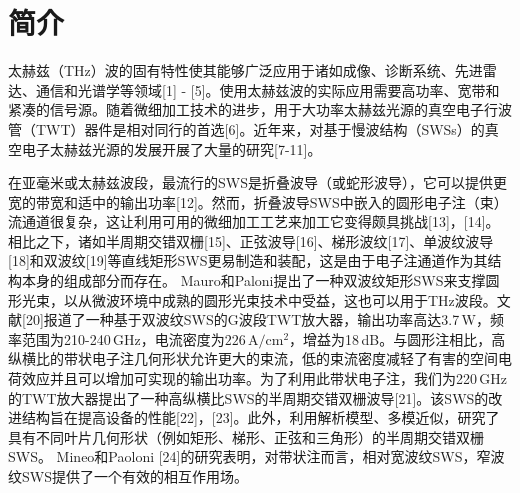 \documentclass[10pt,a4paper,UTF8]{ctexart}
\begin{document}
	\renewcommand\thesection{\Roman{section}}

\section{简介}
太赫兹（THz）波的固有特性使其能够广泛应用于诸如成像、诊断系统、先进雷达、通信和光谱学等领域[1] - [5]。使用太赫兹波的实际应用需要高功率、宽带和紧凑的信号源。随着微细加工技术的进步，用于大功率太赫兹光源的真空电子行波管（TWT）器件是相对同行的首选[6]。近年来，对基于慢波结构（SWSs）的真空电子太赫兹光源的发展开展了大量的研究[7-11]。

在亚毫米或太赫兹波段，最流行的SWS是折叠波导（或蛇形波导），它可以提供更宽的带宽和适中的输出功率[12]。然而，折叠波导SWS中嵌入的圆形电子注（束）流通道很复杂，这让利用可用的微细加工工艺来加工它变得颇具挑战[13]，[14]。相比之下，诸如半周期交错双栅[15]、正弦波导[16]、梯形波纹[17]、单波纹波导[18]和双波纹[19]等直线矩形SWS更易制造和装配，这是由于电子注通道作为其结构本身的组成部分而存在。 Mauro和Paloni提出了一种双波纹矩形SWS来支撑圆形光束，以从微波环境中成熟的圆形光束技术中受益，这也可以用于THz波段。文献[20]报道了一种基于双波纹SWS的G波段TWT放大器，输出功率高达3.7\,W，频率范围为210-240\,GHz，电流密度为$226\,\textrm{A}/\textrm{cm}^2 $，增益为18\,dB。与圆形注相比，高纵横比的带状电子注几何形状允许更大的束流，低的束流密度减轻了有害的空间电荷效应并且可以增加可实现的输出功率。为了利用此带状电子注，我们为220\,GHz的TWT放大器提出了一种高纵横比SWS的半周期交错双栅波导[21]。该SWS的改进结构旨在提高设备的性能[22]，[23]。此外，利用解析模型、多模近似，研究了具有不同叶片几何形状（例如矩形、梯形、正弦和三角形）的半周期交错双栅SWS。 Mineo和Paoloni [24]的研究表明，对带状注而言，相对宽波纹SWS，窄波纹SWS提供了一个有效的相互作用场。
\end{document}

